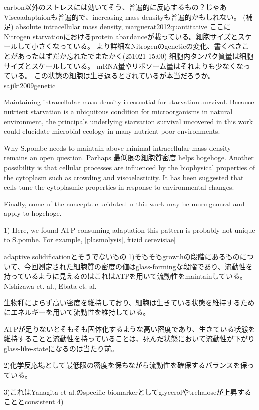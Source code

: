carbon以外のストレスには効いてそう、普遍的に反応するもの？じゃあViscoadaptaionも普遍的で、increasing mass densityも普遍的かもしれない。
(補足)
absolute intracellular mass density, marguerat2012quantitative
ここにNitrogen starvationにおけるprotein abandanceが載っている。細胞サイズとスケールして小さくなっている。
より詳細なNitrogenのgeneticの変化、書くべきことがあったはずだか忘れたでまたかく(251021 15:00)
細胞内タンパク質量は細胞サイズとスケールしている。
mRNA量やリボソーム量はそれよりも少なくなっている。
この状態の細胞は生き返るとされているが本当だろうか。
sajiki2009genetic

Maintaining intracellular mass density is essential for starvation survival. Because nutrient starvation is a ubiquitous condition for microorganisms in natural environment, the principals underlying starvation survival uncovered in this work could elucidate microbial ecology in many nutrient poor environments. 

Why S.pombe needs to maintain above minimal intracellular mass density remains an open question. 
Parhaps 最低限の細胞質密度 helps hogehoge.
Another possibility is that cellular processes are influenced by the biophysical properties of the cytoplasm such as crowding and viscoelasticity. It has been suggested that cells tune the cytoplasmic properties in response to environmental changes.

Finally, some of the concepts elucidated in this work may be more general and apply to hogehoge.

1) Here, we found ATP consuming adaptation
this pattern is probably not unique to S.pombe. For example, [plasmolysis],[frizid cerevisiae]

adaptive solidificationとそうでないもの
1)そもそもgrowthの段階にあるものについて、今回測定された細胞質の密度の値はglass-formingな段階であり、流動性を持っているように見えるのはこれはATPを用いて流動性をmaintainしている。Nishizawa et. al., Ebata et. al.

生物種によらず高い密度を維持しており、細胞は生きている状態を維持するためにエネルギーを用いて流動性を維持している。

ATPが足りないとそもそも固体化するような高い密度であり、生きている状態を維持することと流動性を持っていることは、死んだ状態において流動性が下がりglass-like-stateになるのは当たり前。

2)化学反応場として最低限の密度を保ちながら流動性を確保するバランスを保っている。

3)これはYanagita et al.のspecific biomarkerとしてglycerolやtrehaloseが上昇することとconsistent
4)

